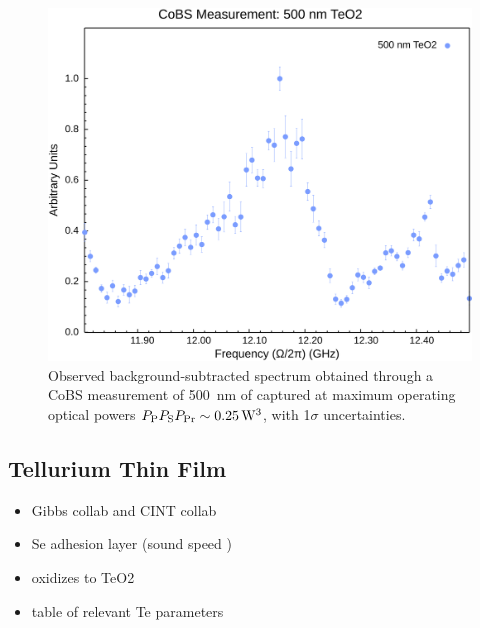 \begin{figure}[t]
  \centering
  \hspace{-2em}\includegraphics[width=\textwidth]{figs/4-Raman/CoBS Measurement: 500 nm TeO2.png}
  \caption{Observed background-subtracted spectrum obtained through a \ac{CoBS} measurement of \SI{500}{\nano\meter} of  captured at maximum operating optical powers \(P_{\rm P}P_{\rm S}P_{\rm Pr} \sim \SI{0.25}{\cubic\watt}\), with 1\(\sigma\) uncertainties.}
  \label{fig:Raman:500nmTeO2}
\end{figure}

\subsection{Tellurium Thin Film}
\label{subsec:Raman:Target:Te}

\begin{itemize}
  \item Gibbs collab and CINT collab
  \item Se adhesion layer (sound speed \cite{kozhevnikov2007sound})
  \item oxidizes to TeO2
  \item table of relevant Te parameters
\end{itemize}

